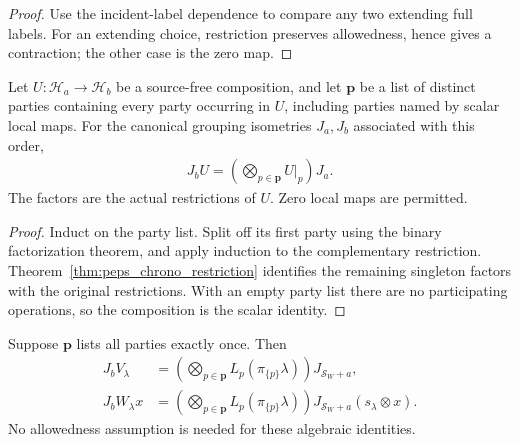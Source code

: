 \begin{proof}
    \leanok
    Use the incident-label dependence to compare any two extending full labels.
    For an extending choice, restriction preserves allowedness, hence gives a
    contraction; the other case is the zero map.
\end{proof}

\begin{theorem}
    \label{thm:peps_chrono_canonical_factors}
    \leanok
    Let $U:\mathcal H_a\to\mathcal H_b$ be a source-free composition, and let
    $\mathbf p$ be a list of distinct parties containing every party occurring
    in $U$, including parties named by scalar local maps. For the canonical
    grouping isometries $J_a,J_b$ associated with this order,
    \begin{align}
        J_b U=\left(\bigotimes_{p\in\mathbf p}U|_p\right)J_a.
        \label{eq:peps_chrono_canonical_factors}
    \end{align}
    The factors are the actual restrictions of $U$. Zero local maps are permitted.
\end{theorem}

\begin{proof}
    \leanok
    Induct on the party list. Split off its first party using the binary
    factorization theorem, and apply induction to the complementary restriction.
    Theorem~\ref{thm:peps_chrono_restriction} identifies the remaining singleton
    factors with the original restrictions. With an empty party list there are
    no participating operations, so the composition is the scalar identity.
\end{proof}

\begin{theorem}
    \label{thm:peps_chrono_complete_factors}
    \leanok
    Suppose $\mathbf p$ lists all parties exactly once. Then
    \begin{align}
        J_b V_\lambda
         & =\left(\bigotimes_{p\in\mathbf p}L_p(\pi_{\{p\}}\lambda)\right)
        J_{\mathcal S_W\mathbin{+}a},
        \label{eq:peps_chrono_complete_factors}                            \\
        J_b W_\lambda x
         & =\left(\bigotimes_{p\in\mathbf p}L_p(\pi_{\{p\}}\lambda)\right)
        J_{\mathcal S_W\mathbin{+}a}(s_\lambda\otimes x).
        \label{eq:peps_chrono_complete_vectors}
    \end{align}
    No allowedness assumption is needed for these algebraic identities.
\end{theorem}

